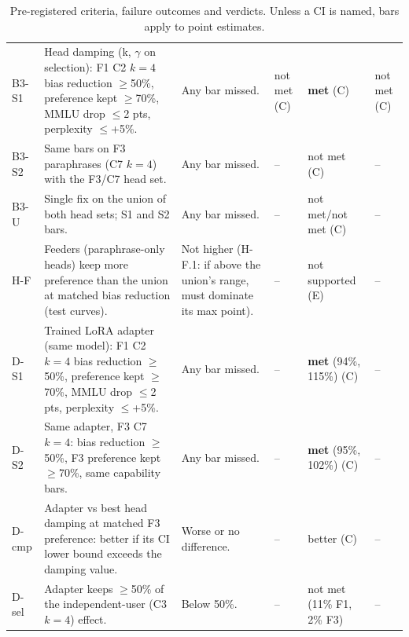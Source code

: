 \begin{table}[!htbp]
\begin{tabular}{@{}p{1.1cm}p{5.6cm}p{4.1cm}p{1.15cm}p{1.15cm}p{1.15cm}@{}}
B3-S1 & Head damping (k, $\gamma$ on selection): F1 C2 $k{=}4$ bias reduction $\ge$50\%, preference kept $\ge$70\%, MMLU drop $\le$2 pts, perplexity $\le$+5\%. & Any bar missed. & not met (C) & \textbf{met} (C) & not met (C) \\
B3-S2 & Same bars on F3 paraphrases (C7 $k{=}4$) with the F3/C7 head set. & Any bar missed. & -- & not met (C) & -- \\
B3-U & Single fix on the union of both head sets; S1 and S2 bars. & Any bar missed. & -- & not met/not met (C) & -- \\
H-F & Feeders (paraphrase-only heads) keep more preference than the union at matched bias reduction (test curves). & Not higher (H-F.1: if above the union's range, must dominate its max point). & -- & not supported (E) & -- \\
D-S1 & Trained LoRA adapter (same model): F1 C2 $k{=}4$ bias reduction $\ge$50\%, preference kept $\ge$70\%, MMLU drop $\le$2 pts, perplexity $\le$+5\%. & Any bar missed. & -- & \textbf{met} (94\%, 115\%) (C) & -- \\
D-S2 & Same adapter, F3 C7 $k{=}4$: bias reduction $\ge$50\%, F3 preference kept $\ge$70\%, same capability bars. & Any bar missed. & -- & \textbf{met} (95\%, 102\%) (C) & -- \\
D-cmp & Adapter vs best head damping at matched F3 preference: better if its CI lower bound exceeds the damping value. & Worse or no difference. & -- & better (C) & -- \\
D-sel & Adapter keeps $\ge$50\% of the independent-user (C3 $k{=}4$) effect. & Below 50\%. & -- & not met (11\% F1, 2\% F3) & -- \\
\bottomrule\end{tabular}\caption{Pre-registered criteria, failure outcomes and verdicts. Unless a CI is named, bars apply to point estimates.}\label{tab:prereg}\end{table}

